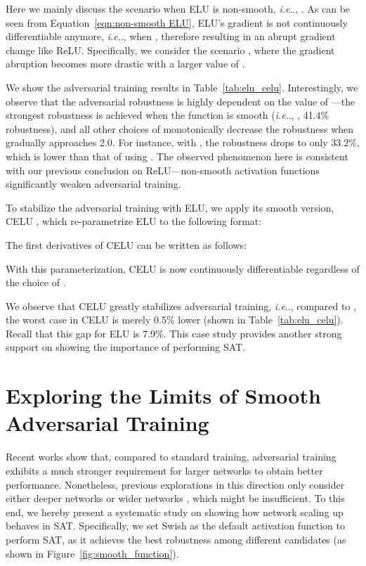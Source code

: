 \documentclass{article}
\makeatletter
\DeclareRobustCommand\onedot{\futurelet\@let@token\@onedot}
\def\@onedot{\ifx\@let@token.\else.\null\fi\xspace}
\def\ie{\emph{i.e}\onedot} \def\Ie{\emph{I.e}\onedot}
\makeatother
\begin{document}
Here we mainly discuss the scenario when ELU is non-smooth, \ie, . As can be seen from Equation~\eqref{eqn:non-smooth ELU}, ELU's gradient is not continuously differentiable anymore, \ie,  when , therefore resulting in an abrupt gradient change like ReLU. Specifically, we consider the scenario , where the gradient abruption becomes more drastic with a larger value of .

We show the adversarial training results in Table~\ref{tab:elu_celu}. Interestingly, we observe that the adversarial robustness is highly dependent on the value of ---the strongest robustness is achieved when the function is smooth (\ie, , 41.4\% robustness), and all other choices of  monotonically decrease the robustness when  gradually approaches 2.0. For instance, with , the robustness drops to only 33.2\%, which is  lower than that of using . The observed phenomenon here is consistent with our previous conclusion on ReLU---non-smooth activation functions significantly weaken adversarial training.

To stabilize the adversarial training with ELU, we apply its smooth version, CELU \cite{barron2017continuously}, which re-parametrize ELU to the following format:

The first derivatives of CELU can be written as follows:

With this parameterization, CELU is now continuously differentiable regardless of the choice of . 

We observe that CELU greatly stabilizes adversarial training, \ie, compared to , the worst case in CELU is merely 0.5\% lower (shown in Table~\ref{tab:elu_celu}). Recall that this gap for ELU is 7.9\%. This case study provides another strong support on showing the importance of performing SAT.


\section{Exploring the Limits of Smooth Adversarial Training}
Recent works \cite{xie2020intriguing,gao2019convergence} show that, compared to standard training, adversarial training exhibits a much stronger requirement for larger networks to obtain better performance. Nonetheless, previous explorations in this direction only consider either deeper networks \cite{xie2020intriguing} or wider networks \cite{Madry2018}, which might be insufficient. To this end, we hereby present a systematic study on showing how network scaling up behaves in SAT. Specifically, we set Swish as the default activation function to perform SAT, as it achieves the best robustness among different candidates (as shown in Figure~\ref{fig:smooth_function}).
\end{document}

